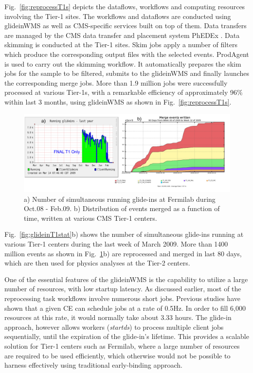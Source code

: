 \documentclass[a4paper]{jpconf}
\begin{document}
Fig.~\ref{fig:reprocessT1s} depicts the dataflows, workflows and computing resources involving the Tier-1 sites.
The workflows and dataflows are conducted using glideinWMS  as well as CMS-specific services 
built on top of them. Data transfers are managed by the CMS data transfer and placement 
system PhEDEx \cite{bib:cms_phedex}. Data skimming is conducted at the Tier-1 sites. Skim jobs apply a number of filters which produce the 
corresponding output files with the selected events. ProdAgent is used to carry out the skimming workflow. 
It automatically prepares the skim jobs for the sample to be filtered, submits to the glideinWMS and finally
launches the corresponding merge jobs. More than 1.9 million jobs were successfully processed at various 
Tier-1s, with a remarkable efficiency of approximately 96\% within last 3 months, using glideinWMS as shown 
in Fig.~\ref{fig:reprocessT1s}.
\begin{figure}
\begin{center}
\includegraphics[scale=0.55]{merged_events}
\end{center}
\caption{a) Number of simultaneous running glide-ins at Fermilab during Oct.08 - Feb.09. b) Distribution of 
events merged as a function of time, written at various CMS Tier-1 centers.}
\label{fig:merged_events}
\end{figure}
Fig.~\ref{fig:glideinT1stat}b) shows the number of simultaneous glide-ins running at various Tier-1 centers during the last week of March 2009. 
More than 1400 million events as shown in Fig.~\ref{fig:merged_events}b) are reprocessed and merged in last 80 days, which are then 
used for physics analyses at the Tier-2 centers. 

One of the essential features of the glideinWMS is the capability to utilize a large number of
resources, with low startup latency. As discussed earlier, most of the reprocessing task 
workflows involve numerous short jobs. Previous studies have shown that a given CE can 
schedule jobs at a rate of 0.5Hz. In order to fill 6,000 resources at this rate, it would normally take 
about 3.33 hours.  The glide-in approach, however allows workers (\emph{startds}) 
to process multiple client jobs sequentially, until 
the expiration of the glide-in's lifetime. This provides a scalable solution for Tier-1 centers such as Fermilab, 
where a large number of resources are required to be used efficiently, which otherwise would not 
be possible to harness effectively using traditional early-binding approach.
\end{document}
